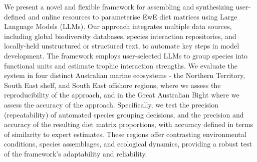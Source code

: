 We present a novel and flexible framework for assembling and synthesizing user-defined and online resources to parameterise EwE diet matrices using Large Language Models (LLMs). Our approach integrates multiple data sources, including global biodiversity databases, species interaction repositories, and locally-held unstructured or structured text, to automate key steps in model development. The framework employs user-selected LLMs to group species into functional units and estimate trophic interaction strengths. We evaluate the system in four distinct Australian marine ecosystems - the Northern Territory, South East shelf, and South East offshore regions, where we assess the reproducibility of the approach, and in the Great Australian Bight where we assess the accuracy of the approach. Specifically, we test the precision (repeatability) of automated species grouping decisions, and the precision and accuracy of the resulting diet matrix proportions, with accuracy defined in terms of similarity to expert estimates. These regions offer contrasting environmental conditions, species assemblages, and ecological dynamics, providing a robust test of the framework's adaptability and reliability.


